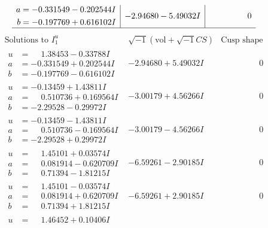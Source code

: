 \documentclass[1p]{elsarticle_modified}
\theoremstyle{definition}
\newcommand{\I}{\sqrt{-1}}
\begin{document}
$$\begin{array}{c|c|c}
\begin{aligned}
a &= -0.331549 - 0.202544 I \\
b &= -0.197769 + 0.616102 I\end{aligned}
 & -2.94680 - 5.49032 I & \phantom{-0.000000 } 0\\
 \hline 
 \end{array}$$\newpage$$\begin{array}{c|c|c}  
\text{Solutions to }I^u_{1}& \I (\text{vol} + \sqrt{-1}CS) & \text{Cusp shape}\\
 \hline 
\begin{aligned}
u &= \phantom{-}1.38453 - 0.33788 I \\
a &= -0.331549 + 0.202544 I \\
b &= -0.197769 - 0.616102 I\end{aligned}
 & -2.94680 + 5.49032 I & \phantom{-0.000000 } 0 \\ \hline\begin{aligned}
u &= -0.13459 + 1.43811 I \\
a &= \phantom{-}0.510736 + 0.169564 I \\
b &= -2.29528 - 0.29972 I\end{aligned}
 & -3.00179 + 4.56266 I & \phantom{-0.000000 } 0 \\ \hline\begin{aligned}
u &= -0.13459 - 1.43811 I \\
a &= \phantom{-}0.510736 - 0.169564 I \\
b &= -2.29528 + 0.29972 I\end{aligned}
 & -3.00179 - 4.56266 I & \phantom{-0.000000 } 0 \\ \hline\begin{aligned}
u &= \phantom{-}1.45101 + 0.03574 I \\
a &= \phantom{-}0.081914 - 0.620709 I \\
b &= \phantom{-}0.71394 - 1.81215 I\end{aligned}
 & -6.59261 - 2.90185 I & \phantom{-0.000000 } 0 \\ \hline\begin{aligned}
u &= \phantom{-}1.45101 - 0.03574 I \\
a &= \phantom{-}0.081914 + 0.620709 I \\
b &= \phantom{-}0.71394 + 1.81215 I\end{aligned}
 & -6.59261 + 2.90185 I & \phantom{-0.000000 } 0 \\ \hline\begin{aligned}
u &= \phantom{-}1.46452 + 0.10406 I \\

\end{aligned}
\end{array}$$
\end{document}
